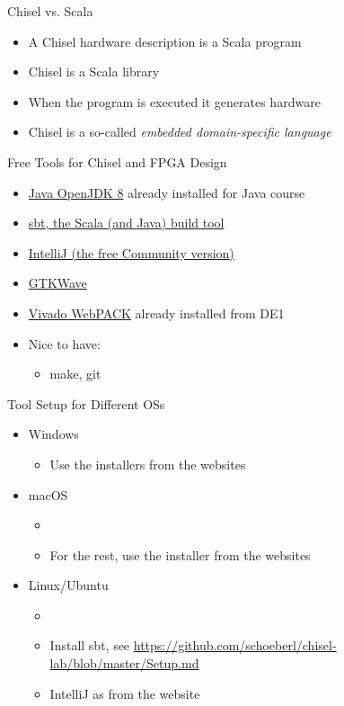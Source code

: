 \begin{frame}[fragile]{Chisel vs. Scala}
\begin{itemize}
\item A Chisel hardware description is a Scala program
\item Chisel is a Scala library
\item When the program is executed it generates hardware
\item Chisel is a so-called \emph{embedded domain-specific language}
\end{itemize}
\end{frame}


\begin{frame}[fragile]{Free Tools for Chisel and FPGA Design}
\begin{itemize}
\item \href{https://adoptopenjdk.net/}{Java OpenJDK 8} already installed for Java course
\item \href{https://www.scala-sbt.org/}{sbt, the Scala (and Java) build tool}
\item \href{https://www.jetbrains.com/idea/download/}{IntelliJ (the free Community version)}
\item \href{http://gtkwave.sourceforge.net/}{GTKWave}
\item \href{https://www.xilinx.com/products/design-tools/vivado/vivado-webpack.html}{Vivado WebPACK} already installed from DE1
\item Nice to have:
\begin{itemize}
\item make, git
\end{itemize}
\end{itemize}
\end{frame}

\begin{frame}[fragile]{Tool Setup for Different OSs}
\begin{itemize}
\item Windows
\begin{itemize}
\item Use the installers from the websites
\end{itemize}
\item macOS
\begin{itemize}
\item {}
\item For the rest, use the installer from the websites
\end{itemize}
\item Linux/Ubuntu
\begin{itemize}
\item {}
\item Install sbt, see \url{https://github.com/schoeberl/chisel-lab/blob/master/Setup.md}
\item IntelliJ as from the website
\end{itemize}
\end{itemize}
\end{frame}

